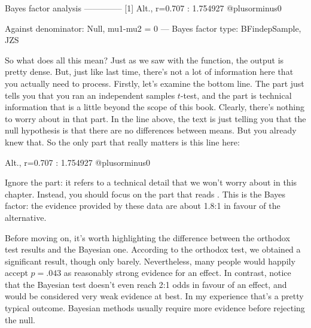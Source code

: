 \begin{rblock1}
Bayes factor analysis
--------------
[1] Alt., r=0.707 : 1.754927 @plusorminus0%

Against denominator:
  Null, mu1-mu2 = 0 
---
Bayes factor type: BFindepSample, JZS
\end{rblock1}


So what does all this mean? Just as we saw with the  function, the output is pretty dense. But, just like last time, there's not a lot of information here that you actually need to process. Firstly, let's examine the bottom line. The  part just tells you that you ran an independent samples $t$-test, and the  part is technical information that is a little beyond the scope of this book. Clearly, there's nothing to worry about in that part. In the line above, the text  is just telling you that the null hypothesis is that there are no differences between means. But you already knew that. So the only part that really matters is this line here:
\begin{rblock1}
[1] Alt., r=0.707 : 1.754927 @plusorminus0%
\end{rblock1}
Ignore the  part: it refers to a technical detail that we won't worry about in this chapter. Instead, you should focus on the part that reads . This is the Bayes factor: the evidence provided by these data are about 1.8:1 in favour of the alternative. 

Before moving on, it's worth highlighting the difference between the orthodox test results and the Bayesian one. According to the orthodox test, we obtained a significant result, though only barely. Nevertheless, many people would happily accept $p=.043$ as reasonably strong evidence for an effect. In contrast, notice that the Bayesian test doesn't even reach 2:1 odds in favour of an effect, and would be considered very weak evidence at best. In my experience that's a pretty typical outcome. Bayesian methods usually require more evidence before rejecting the null.

